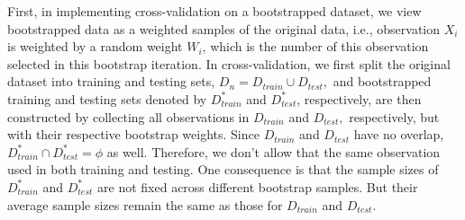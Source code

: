 \documentclass[12pt]{article}
\begin{document}
First, in implementing cross-validation on a bootstrapped dataset, we view bootstrapped data as a weighted samples of the original data, i.e., observation $X_i$ is weighted by a random weight $W_i$, which is the number of this observation selected in this bootstrap iteration. In cross-validation, we first split the original dataset into training and testing sets, $D_n=D_{train}\cup D_{test},$ and bootstrapped training and testing sets denoted by $D^*_{train}$ and $D^*_{test}$, respectively, are then constructed by collecting all observations in $D_{train}$ and $D_{test},$ respectively, but with their respective bootstrap weights. Since $D_{train}$ and $D_{test}$ have no overlap, $D^*_{train}\cap D^*_{test}=\phi$ as well. Therefore, we don't allow that the same observation used in both training and testing. One consequence is that the sample sizes of $D^*_{train}$ and $D^*_{test}$ are not fixed across different bootstrap samples.  But their average sample sizes remain the same as those for $D_{train}$ and $D_{test}.$  
\end{document}
